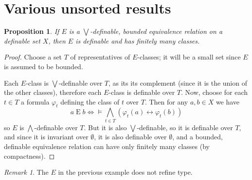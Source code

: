 \documentclass[final,a4paper,12pt]{amsart}
\newtheorem{prop}[thm]{Proposition}
\theoremstyle{remark}
\newtheorem{rem}[thm]{Remark}
\theoremstyle{definition}
\newcommand{\liff}{\mathrel{\leftrightarrow}}
\newcommand{\bigland}{\bigwedge}
\newcommand{\biglor}{\bigvee}
\begin{document}
	\section{Various unsorted results}
	\begin{prop}
		If $E$ is a $\biglor$-definable, bounded equivalence relation on a definable set $X$, then $E$ is definable and has finitely many classes.
	\end{prop}
	\begin{proof}
		Choose a set $T$ of representatives of $E$-classes; it will be a small set since $E$ is assumed to be bounded.
		
		Each $E$-class is $\biglor$-definable over $T$, as its its complement (since it is the union of the other classes), therefore each $E$-class is definable over $T$. Now, choose for each $t\in T$ a formula $\varphi_t$ defining the class of $t$ over $T$. Then for any $a,b\in X$ we have
		\[
		a\mathrel{E}b\iff \models \bigland_{t\in T} (\varphi_t(a)\liff \varphi_t(b))
		\]
		so $E$ is $\bigland$-definable over $T$. But it is also $\biglor$-definable, so it is definable over $T$, and since it is invariant over $\emptyset$, it is also definable over $\emptyset$, and a bounded, definable equivalence relation can have only finitely many classes (by compactness).
	\end{proof}
	
	
	
	\begin{rem}
		The $E$ in the previous example does not refine type.
	\end{rem}
	\printbibliography
\end{document}
